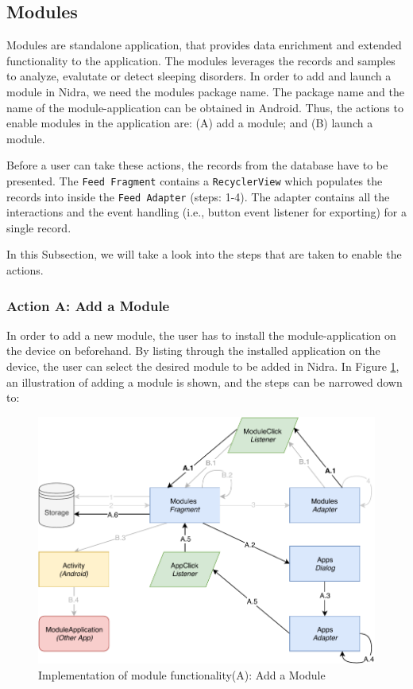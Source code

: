 \subsection{Modules}
Modules are standalone application, that provides data enrichment and extended functionality to the application. The modules leverages the records and samples to analyze, evalutate or detect sleeping disorders. In order to add and launch a module in Nidra, we need the modules package name. The package name and the name of the module-application can be obtained in Android. Thus, the actions to enable modules in the application are: (A) add a module; and (B) launch a module. 

Before a user can take these actions, the records from the database have to be presented. The \verb|Feed Fragment| contains a \verb|RecyclerView| which populates the records into inside the \verb|Feed Adapter| (steps: 1-4). The adapter contains all the interactions and the event handling (i.e., button event listener for exporting) for a single record. 

In this Subsection, we will take a look into the steps that are taken to enable the actions.

\subsubsection{Action A: Add a Module}
In order to add a new module, the user has to install the module-application on the device on beforehand. By listing through the installed application on the device, the user can select the desired module to be added in Nidra. In Figure \ref{fig:impl_modulesA}, an illustration of adding a module is shown, and the steps can be narrowed down to:

\begin{figure}
    \centering
    \includegraphics[scale=0.7]{images/Module_ImpA.pdf}
    \caption{Implementation of module functionality(A): Add a Module}
    \label{fig:impl_modulesA}
\end{figure}

